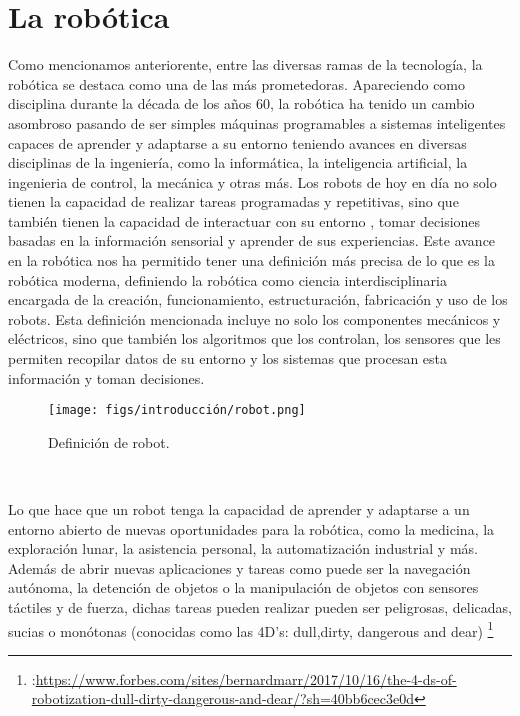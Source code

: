\section{La robótica}
\label{sec:enfoquesrobotica}
Como mencionamos anteriorente, entre las diversas ramas de la tecnología, la robótica se destaca como una de las más prometedoras. Apareciendo como disciplina durante la década de los años 60, 
la robótica ha tenido un cambio asombroso  pasando de ser simples máquinas programables a sistemas inteligentes capaces de aprender y adaptarse 
a su entorno teniendo avances en diversas disciplinas de la ingeniería, como la informática, la inteligencia artificial, la ingenieria de control, la mecánica y otras más. 
Los robots de hoy en día no solo tienen la capacidad de realizar tareas programadas y repetitivas, sino que también tienen la capacidad de interactuar con su entorno
, tomar decisiones basadas en la información sensorial y aprender de sus experiencias. Este avance en la robótica nos ha permitido tener una definición más precisa de lo que es 
la robótica moderna, definiendo la robótica como ciencia interdisciplinaria encargada de la creación, funcionamiento, estructuración, fabricación y uso de los robots. 
Esta definición mencionada incluye no solo los componentes mecánicos y eléctricos, sino que también los algoritmos que los controlan, los sensores que les permiten recopilar
datos de su entorno y los sistemas que procesan esta información y toman decisiones.

\begin{figure} [H]
  \begin{center}
    \texttt{[image: figs/introducción/robot.png]}
  \end{center}
  \caption{Definición de robot.}
  \label{fig:robot}
\end{figure}\

Lo que hace que un robot tenga la capacidad de aprender y adaptarse a un entorno abierto de nuevas oportunidades para la robótica, como la medicina, la exploración
lunar, la asistencia personal, la automatización industrial y más. Además de abrir nuevas aplicaciones y tareas como puede ser la navegación autónoma, la detención de objetos o 
la manipulación de objetos con sensores táctiles y de fuerza, dichas tareas pueden realizar pueden ser peligrosas, delicadas, sucias o monótonas 
(conocidas como las 4D's: dull,dirty, dangerous and dear) \footnote{:\url{https://www.forbes.com/sites/bernardmarr/2017/10/16/the-4-ds-of-robotization-dull-dirty-dangerous-and-dear/?sh=40bb6cec3e0d}}

